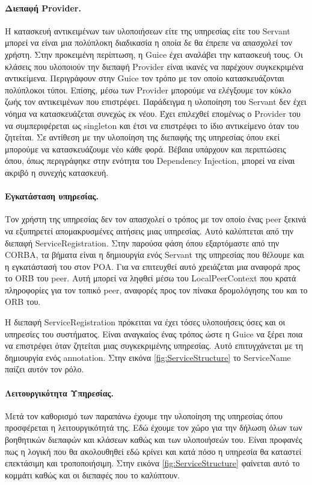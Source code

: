 \paragraph{Διεπαφή Provider.} Η κατασκευή αντικειμένων των υλοποιήσεων είτε 
της υπηρεσίας είτε του Servant μπορεί να είναι μια πολύπλοκη διαδικασία 
η οποία δε θα έπρεπε να απασχολεί τον χρήστη. Στην προκειμένη περίπτωση, 
η Guice έχει αναλάβει την κατασκευή τους. Οι κλάσεις που υλοποιούν την 
διεπαφή Provider είναι ικανές να παρέχουν συγκεκριμένα αντικείμενα. 
Περιγράφουν στην Guice τον τρόπο με τον οποίο κατασκευάζονται πολύπλοκοι 
τύποι. Επίσης, μέσω των Provider μπορούμε να ελέγξουμε τον κύκλο ζωής 
τον αντικειμένων που επιστρέφει. Παράδειγμα η υλοποίηση του Servant δεν 
έχει νόημα να κατασκευάζεται συνεχώς εκ νέου. Έχει επιλεχθεί επομένως ο 
Provider του να συμπεριφέρεται ως singleton και έτσι να επιστρέφει το 
ίδιο αντικείμενο όταν του ζητείται. Σε αντίθεση με την υλοποίηση της 
διεπαφής της υπηρεσίας όπου εκεί μπορούμε να κατασκευάζουμε νέο κάθε 
φορά. Βέβαια υπάρχουν και περιπτώσεις όπου, όπως περιγράφηκε στην 
ενότητα του Dependency Injection, μπορεί να είναι ακριβό η συνεχής 
κατασκευή.

\paragraph{Εγκατάσταση υπηρεσίας.} Τον χρήστη της υπηρεσίας δεν τον 
απασχολεί ο τρόπος με τον οποίο ένας peer ξεκινά να εξυπηρετεί 
απομακρυσμένες αιτήσεις μιας υπηρεσίας. Αυτό καλύπτεται από την διεπαφή 
ServiceRegistration. Στην παρούσα φάση όπου εξαρτόμαστε από την CORBA, 
τα βήματα είναι η δημιουργία ενός Servant της υπηρεσίας που θέλουμε και 
η εγκατάστασή του στον POA. Για να επιτευχθεί αυτό χρειάζεται μια 
αναφορά προς το ORB του peer. Αυτή μπορεί να ληφθεί μέσω του 
LocalPeerContext που κρατά πληροφορίες για τον τοπικό peer, αναφορές 
προς τον πίνακα δρομολόγησης του και το ORB του.

Η διεπαφή ServiceRegistration πρόκειται να έχει τόσες υλοποιήσεις όσες 
και οι υπηρεσίες του συστήματος. Είναι αναγκαίος ένας τρόπος ώστε η 
Guice να ξέρει ποια να επιστρέφει όταν ζητείται μιας συγκεκριμένης 
υπηρεσίας. Αυτό επιτυγχάνεται με τη δημιουργία ενός annotation. Στην 
εικόνα \ref{fig:ServiceStructure} το ServiceName παίζει αυτόν τον ρόλο.

\paragraph{Λειτουργικότητα Υπηρεσίας.} Μετά τον καθορισμό των παραπάνω 
έχουμε την υλοποίηση της υπηρεσίας όπου προσφέρεται η λειτουργικότητά της. 
Εδώ έχουμε τον χώρο για την δήλωση όλων των βοηθητικών διεπαφών και κλάσεων 
καθώς και των υλοποιήσεών του. Είναι προφανές πως η λογική που θα 
ακολουθηθεί εδώ κρίνει και κατά πόσο η υπηρεσία θα καταστεί επεκτάσιμη 
και τροποποιήσιμη. Στην εικόνα \ref{fig:ServiceStructure} φαίνεται αυτό 
το κομμάτι καθώς και οι διεπαφές που το καλύπτουν.

